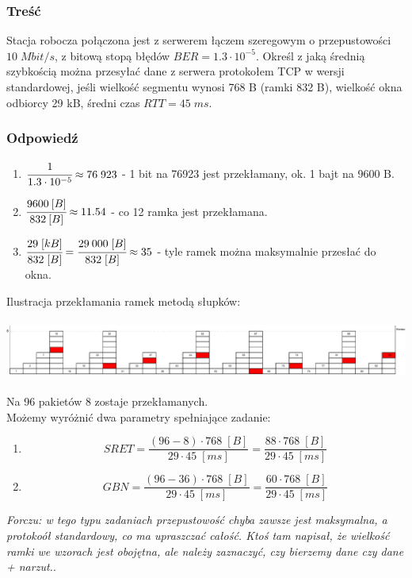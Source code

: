 		\subsubsection{Treść}
			Stacja robocza połączona jest z serwerem łączem szeregowym o przepustowości $ 10\;Mbit/s $, z bitową stopą błędów $ BER=1.3\cdot 10^{-5} $. Określ z jaką średnią szybkością można przesyłać dane z serwera protokołem TCP w wersji standardowej, jeśli wielkość segmentu wynosi 768 B (ramki 832 B), wielkość okna odbiorcy 29 kB, średni czas $ RTT=45\;ms $.
		\subsubsection{Odpowiedź}
			\begin{enumerate}
				\item $ \cfrac{1}{1.3\cdot 10^{-5}}\approx 76\;923 $ - 1 bit na 76923 jest przekłamany, ok. 1 bajt na 9600 B.
				\item $ \cfrac{9600\:[B]}{832\:[B]}\approx11.54 $ - co 12 ramka jest przekłamana.
				\item $ \cfrac{29\;[kB]}{832\;[B]}=\cfrac{29\:000\;[B]}{832\;[B]}\approx 35 $ - tyle ramek można maksymalnie przesłać do okna.
			\end{enumerate}
			Ilustracja przekłamania ramek metodą słupków:\\\\
			\includegraphics[width=16.0cm]{./images/zadanie08.pdf}\\\\
			Na 96 pakietów 8 zostaje przekłamanych.\\
			Możemy wyróżnić dwa parametry spełniające zadanie:
			\begin{enumerate}
				\item $$ SRET=\frac{(96-8)\cdot 768\;[B]}{29\cdot 45\;[ms]}=\frac{88\cdot 768\;[B]}{29\cdot 45\;[ms]} $$
				\item $$ GBN=\frac{(96-36)\cdot 768\;[B]}{29\cdot 45\;[ms]}=\frac{60\cdot 768\;[B]}{29\cdot 45\;[ms]} $$
			\end{enumerate}
			\small{ \emph{Forczu: w tego typu zadaniach przepustowość chyba zawsze jest maksymalna, a protokoół standardowy, co ma upraszczać całość.
			Ktoś tam napisał, że wielkość ramki we wzorach jest obojętna, ale należy zaznaczyć, czy bierzemy dane czy dane + narzut.}}.
\newpage
